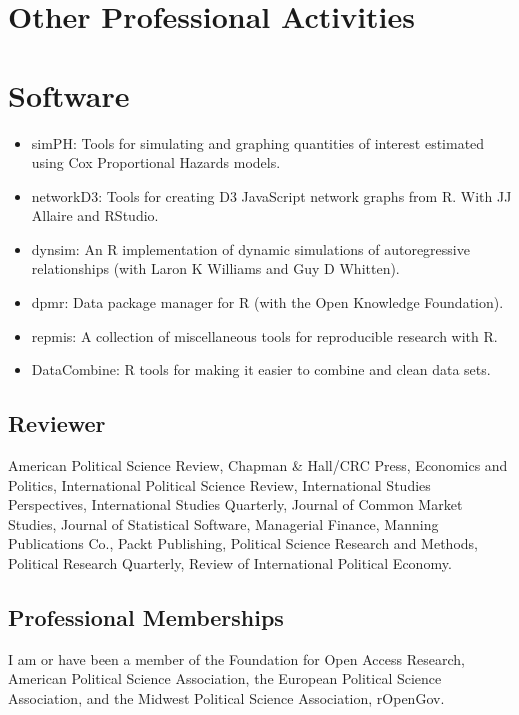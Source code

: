 \documentclass[a4paper]{article}
\begin{document}
{\section*{Other Professional Activities}

\section*{Software}

\begin{itemize}
    \item simPH: Tools for simulating and graphing quantities of interest estimated using Cox Proportional Hazards models.
    \item networkD3: Tools for creating D3 JavaScript network graphs from R. With JJ Allaire and RStudio.
    \item dynsim: An R implementation of dynamic simulations of autoregressive relationships (with Laron K Williams and Guy D Whitten).
    \item dpmr: Data package manager for R (with the Open Knowledge Foundation).
    \item repmis: A collection of miscellaneous tools for reproducible research with R.
    \item DataCombine: R tools for making it easier to combine and clean data sets.
\end{itemize}

\subsection*{Reviewer}

American Political Science Review, Chapman \& Hall/CRC Press, Economics and Politics,
International Political Science Review, International Studies Perspectives, International Studies Quarterly,
Journal of Common Market Studies, Journal of Statistical Software,
Managerial Finance, Manning Publications Co.,
Packt Publishing, Political Science Research and Methods, Political Research
Quarterly, Review of International Political Economy.

\subsection*{Professional Memberships}

I am or have been a member of the Foundation for Open Access Research, American Political Science Association, the European Political Science Association, and the Midwest Political Science Association, rOpenGov.

}
\end{document}
